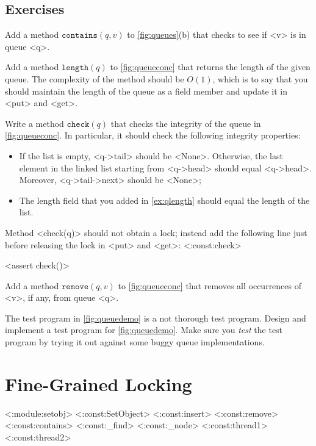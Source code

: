 \documentclass{report}
\newenvironment{code}{
\tcolorbox
}{
\endtcolorbox
}
\begin{document}
\section*{Exercises}
\begin{problems}
\item \label{ex:qcontains} Add a method $\mathtt{contains}(q, v)$ to \autoref{fig:queues}(b)
that checks to see if <{v}> is in queue <{q}>.
\item Add a method $\mathtt{length}(q)$ to \autoref{fig:queueconc} that returns the length of the given queue.
The complexity of the method should be $O(1)$, which is to say that you should maintain
the length of the queue as a field member and update it in <{put}> and <{get}>.
\item \label{ex:qlength} Write a method $\mathtt{check}(q)$
that checks the integrity of the queue in \autoref{fig:queueconc}.
In particular, it should check the following integrity properties:
\begin{itemize}
\item If the list is empty, <{q->tail}> should be <{None}>.
Otherwise, the last element in the linked list starting from <{q->head}>
should equal <{q->head}>. Moreover,
<{q->tail->next}> should be <{None}>;
\item The length field that you added in \autoref{ex:qlength} should equal the length
of the list.
\end{itemize}
Method <{check(q)}> should not obtain a lock; instead add the following line
just before releasing the lock in <{put}> and <{get}>:
<{:const:check}>
\begin{code}
<{assert check()}>
\end{code}
\item \label{ex:qremove} Add a method $\mathtt{remove}(q, v)$ to \autoref{fig:queueconc}
that removes all occurrences of <{v}>, if any, from queue <{q}>.
\item The test program in \autoref{fig:queuedemo} is a not thorough test program.
Design and implement a test program for \autoref{fig:queuedemo}.
Make sure you \emph{test} the test program by trying it out against some buggy
queue implementations.
\end{problems}

\chapter{Fine-Grained Locking}
\label{ch:finegrained}

<{:module:setobj}>
<{:const:SetObject}>
<{:const:insert}>
<{:const:remove}>
<{:const:contains}>
<{:const:_find}>
<{:const:_node}>
<{:const:thread1}>
<{:const:thread2}>
\end{document}

